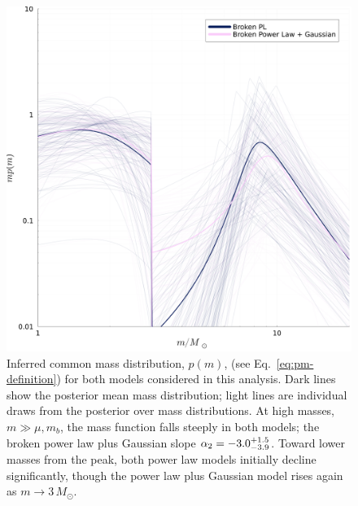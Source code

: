 \documentclass[modern]{aastex631}
\begin{document}
\begin{figure}
    \includegraphics[width=\columnwidth]{figures/pm_traces.pdf}
    \caption{\label{fig:pm-traces} Inferred common mass distribution, $p(m)$,
    (see Eq.~\eqref{eq:pm-definition}) for both models considered in this
    analysis.  Dark lines show the posterior mean mass distribution; light lines
    are individual draws from the posterior over mass distributions.  At high
    masses, $m \gg \mu, m_b$, the mass function falls steeply in both models;
    the broken power law plus Gaussian slope $\alpha_2 = -3.0^{+1.5}_{-3.9}$.
    Toward lower masses from the peak, both power law models initially decline
    significantly, though the power law plus Gaussian model rises again as $m
    \to 3 \, M_\odot$.}
\end{figure}
\end{document}
